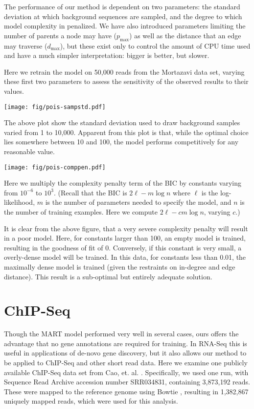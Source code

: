 \documentclass[letterpaper]{article}
\begin{document}
The performance of our method is dependent on two parameters: the standard
deviation at which background sequences are sampled, and the degree to which
model complexity in penalized. We have also introduced parameters limiting the
number of parents a node may have ($p_{\text{max}}$) as well as the distance
that an edge may traverse ($d_{\text{max}}$), but these exist only to control
the amount of CPU time used and have a much simpler interpretation: bigger is
better, but slower.

Here we retrain the model on 50,000 reads from the Mortazavi data
set, varying these first two parameters to assess the sensitivity of the
observed results to their values.

\begin{center}
\texttt{[image: fig/pois-sampstd.pdf]}
\end{center}

The above plot show the standard deviation used to draw background samples
varied from 1 to 10,000. Apparent from this plot is that, while the optimal
choice lies somewhere between 10 and 100, the model performs competitively for
any reasonable value.


\begin{center}
\texttt{[image: fig/pois-comppen.pdf]}
\end{center}

Here we multiply the complexity penalty term of the BIC by constants varying
from $10^{-6}$ to $10^{3}$. (Recall that the BIC is $2\ell - m \log n$ where
$\ell$ is the log-likelihood, $m$ is the number of parameters needed to specify
the model, and $n$ is the number of training examples. Here we compute $2 \ell -
c m \log n$, varying $c$.)

It is clear from the above figure, that a very severe complexity penalty will
result in a poor model. Here, for constants larger than 100, an empty model is
trained, resulting in the goodness of fit of 0. Conversely, if this constant is
very small, a overly-dense model will be trained.  In this data, for constants
less than 0.01, the maximally dense model is trained (given the restraints on
in-degree and edge distance). This result is a sub-optimal but entirely adequate
solution.


\section{ChIP-Seq}

Though the MART model \cite{Li2010} performed very well in several cases, ours
offers the advantage that no gene annotations are required for training.  In
RNA-Seq this is useful in applications of de-novo gene discovery, but it also
allows our method to be applied to ChIP-Seq and other short read data. Here we
examine one publicly available ChIP-Seq data set from Cao, et. al.
\cite{Cao2010}. Specifically, we used one run, with Sequence Read Archive
accession number SRR034831, containing 3,873,192 reads. These were mapped to the
reference genome using Bowtie \cite{Langmead2009}, resulting in 1,382,867
uniquely mapped reads, which were used for this analysis.
\end{document}
